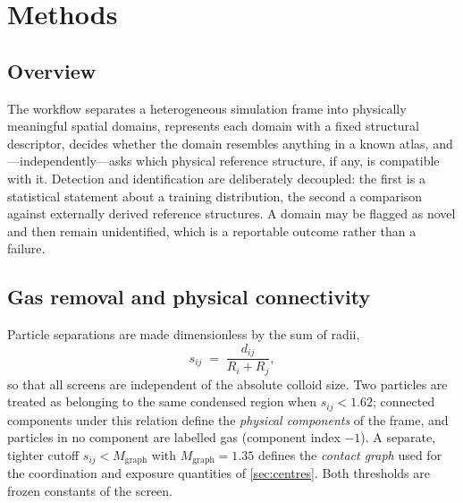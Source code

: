 \section{Methods}
\label{sec:methods}


\subsection{Overview}
\label{sec:methods-overview}

The workflow separates a heterogeneous simulation frame into physically meaningful spatial
domains, represents each domain with a fixed structural descriptor, decides whether the
domain resembles anything in a known atlas, and---independently---asks which physical
reference structure, if any, is compatible with it. Detection and identification are
deliberately decoupled: the first is a statistical statement about a training distribution,
the second a comparison against externally derived reference structures. A domain may be
flagged as novel and then remain unidentified, which is a reportable outcome rather than a
failure.

\subsection{Gas removal and physical connectivity}
\label{sec:gas}

Particle separations are made dimensionless by the sum of radii,
\begin{equation}
  s_{ij} \;=\; \frac{d_{ij}}{R_i + R_j},
  \label{eq:sij}
\end{equation}
so that all screens are independent of the absolute colloid size. Two particles are treated
as belonging to the same condensed region when $s_{ij} < 1.62$; connected components under
this relation define the \emph{physical components} of the frame, and particles in no
component are labelled gas (component index $-1$). A separate, tighter cutoff
$s_{ij} < M_{\mathrm{graph}}$ with $M_{\mathrm{graph}} = 1.35$ defines the
\emph{contact graph} used for the coordination and exposure quantities of
\cref{sec:centres}. Both thresholds are frozen constants of the screen.

